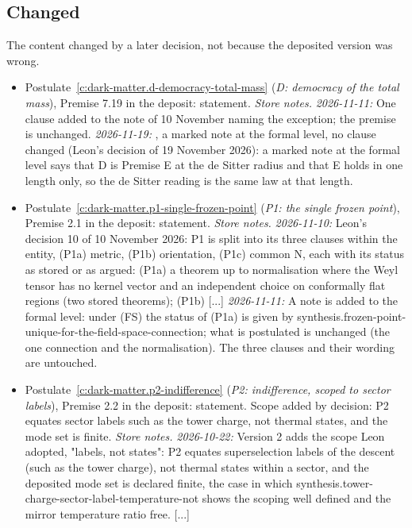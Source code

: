 \documentclass[11pt]{article}
\theoremstyle{definition}
\theoremstyle{plain}
\begin{document}
\subsection*{Changed}
The content changed by a later decision, not because the deposited version was wrong.
\begin{itemize}\setlength{\itemsep}{2pt}
\item Postulate~\ref{c:dark-matter.d-democracy-total-mass} (\emph{D: democracy of the total mass}), Premise 7.19 in the deposit: statement. \emph{Store notes.} \emph{2026-11-11:} One clause added to the note of 10 November naming the exception; the premise is unchanged. \emph{2026-11-19:} , a marked note at the formal level, no clause changed (Leon's decision of 19 November 2026): a marked note at the formal level says that D is Premise E at the de Sitter radius and that E holds in one length only, so the de Sitter reading is the same law at that length.
\item Postulate~\ref{c:dark-matter.p1-single-frozen-point} (\emph{P1: the single frozen point}), Premise 2.1 in the deposit: statement. \emph{Store notes.} \emph{2026-11-10:} Leon's decision 10 of 10 November 2026: P1 is split into its three clauses within the entity, (P1a) metric, (P1b) orientation, (P1c) common N, each with its status as stored or as argued: (P1a) a theorem up to normalisation where the Weyl tensor has no kernel vector and an independent choice on conformally flat regions (two stored theorems); (P1b) [...] \emph{2026-11-11:} A note is added to the formal level: under (FS) the status of (P1a) is given by synthesis.frozen-point-unique-for-the-field-space-connection; what is postulated is unchanged (the one connection and the normalisation). The three clauses and their wording are untouched.
\item Postulate~\ref{c:dark-matter.p2-indifference} (\emph{P2: indifference, scoped to sector labels}), Premise 2.2 in the deposit: statement. Scope added by decision: P2 equates sector labels such as the tower charge, not thermal states, and the mode set is finite. \emph{Store notes.} \emph{2026-10-22:} Version 2 adds the scope Leon adopted, "labels, not states": P2 equates superselection labels of the descent (such as the tower charge), not thermal states within a sector, and the deposited mode set is declared finite, the case in which synthesis.tower-charge-sector-label-temperature-not shows the scoping well defined and the mirror temperature ratio free. [...]

\end{itemize}
\end{document}
